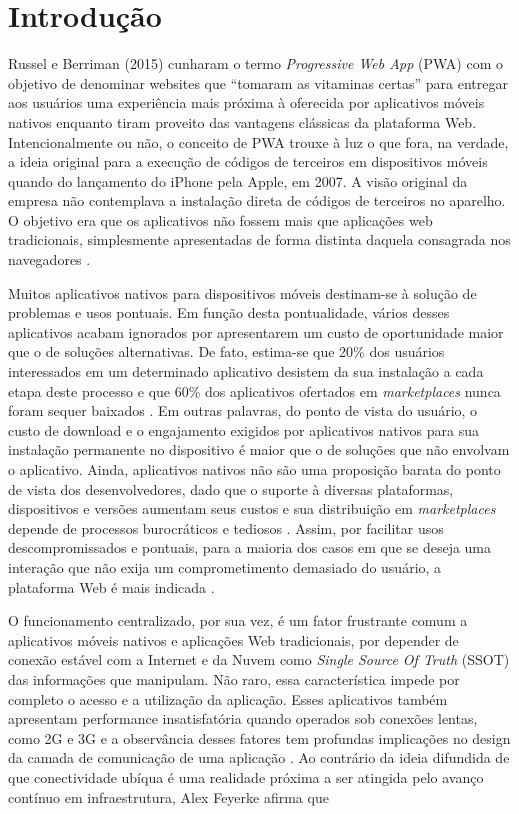 \documentclass[
	article,			%
	11pt,				%
	oneside,			%
	a4paper,			%
	english,			%
	brazil,				%
	sumario=tradicional
	]{abntex2}
\begin{document}
\section*{Introdução}


Russel e Berriman (2015) cunharam o termo \textit{Progressive Web App} (PWA) com o objetivo de denominar websites que “tomaram as vitaminas certas” \cite{russel-2015} para entregar aos usuários uma experiência mais próxima à oferecida por aplicativos móveis nativos enquanto tiram proveito das vantagens clássicas da plataforma Web. Intencionalmente ou não, o conceito de PWA trouxe à luz o que fora, na verdade, a ideia original para a execução de códigos de terceiros em dispositivos móveis quando do lançamento do iPhone pela Apple, em 2007. A visão original da empresa não contemplava a instalação direta de códigos de terceiros no aparelho. O objetivo era que os aplicativos não fossem mais que aplicações web tradicionais, simplesmente apresentadas de forma distinta daquela consagrada nos navegadores \cite{9to5-2011}.

Muitos aplicativos nativos para dispositivos móveis destinam-se à solução de problemas e usos pontuais. Em função desta pontualidade, vários desses aplicativos acabam ignorados por apresentarem um custo de oportunidade maior que o de soluções alternativas. De fato, estima-se que 20\% dos usuários interessados em um determinado aplicativo desistem da sua instalação a cada etapa deste processo \cite{cselle-2012} e que 60\% dos aplicativos ofertados em \textit{marketplaces} nunca foram sequer baixados \cite{thygesen-2013}. Em outras palavras, do ponto de vista do usuário, o custo de download e o engajamento exigidos por aplicativos nativos para sua instalação permanente no dispositivo é maior que o de soluções que não envolvam o aplicativo. Ainda, aplicativos nativos não são uma proposição barata do ponto de vista dos desenvolvedores, dado que o suporte à diversas plataformas, dispositivos e versões aumentam seus custos e sua distribuição em \textit{marketplaces} depende de processos burocráticos e tediosos \cite{kumar-2016}. Assim, por facilitar usos descompromissados e pontuais, para a maioria dos casos em que se deseja uma interação que não exija um comprometimento demasiado do usuário, a plataforma Web é mais indicada \cite{lopes-2016}.

O funcionamento centralizado, por sua vez, é um fator frustrante comum a aplicativos móveis nativos e aplicações Web tradicionais, por depender de conexão estável com a Internet e da Nuvem como \textit{Single Source Of Truth} (SSOT) das informações que manipulam.  Não raro, essa característica impede por completo o acesso e a utilização da aplicação. Esses aplicativos também apresentam performance insatisfatória quando operados sob conexões lentas, como 2G e 3G e a observância desses fatores tem profundas implicações no design da camada de comunicação de uma aplicação \cite{prasad-2011}. Ao contrário da ideia difundida de que conectividade ubíqua é uma realidade próxima a ser atingida pelo avanço contínuo em infraestrutura, Alex Feyerke afirma que
\end{document}
